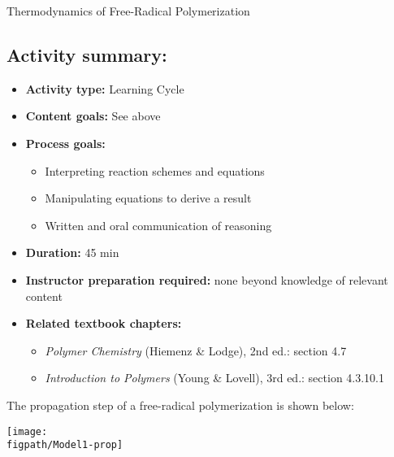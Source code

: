 \begin{activity}{Thermodynamics of Free-Radical Polymerization}
\begin{instructornotes}
	\subsection*{Activity summary:}
	\begin{itemize}
		\item \textbf{Activity type:} Learning Cycle
		\item \textbf{Content goals:} See above
		\item \textbf{Process goals:} %
			\begin{itemize}
				\item Interpreting reaction schemes and equations
				\item Manipulating equations to derive a result
				\item Written and oral communication of reasoning
			\end{itemize}
		\item \textbf{Duration:} 45 min
		\item \textbf{Instructor preparation required:} none beyond knowledge of relevant content
		\item \textbf{Related textbook chapters:}
			\begin{itemize}
				\item \emph{Polymer Chemistry} (Hiemenz \& Lodge), 2nd ed.: section 4.7
				\item \emph{Introduction to Polymers} (Young \& Lovell), 3rd ed.: section 4.3.10.1
			\end{itemize}
	\end{itemize}
	
\end{instructornotes}


\begin{model}
	\label{\labelbase:mdl:propthermo}

	The propagation step of a free-radical polymerization is shown below:
	
	\centerline{\texttt{[image: \\figpath/Model1-prop]}}
	
	

\end{model}
\end{activity}
